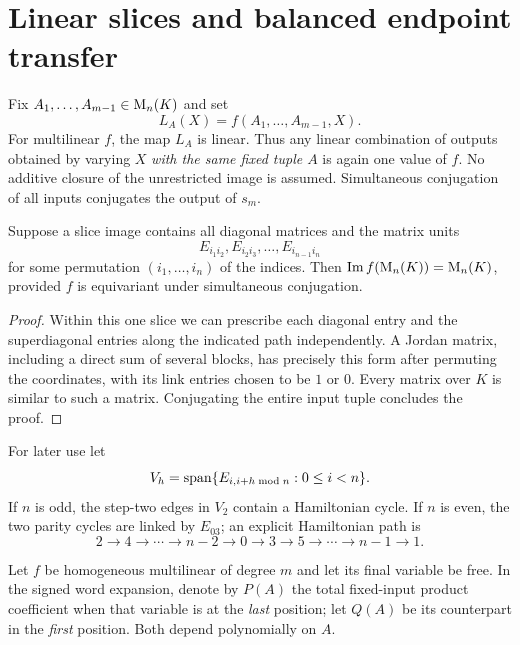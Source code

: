 \section{Linear slices and balanced endpoint transfer}\label{sec:slices}
Fix $A_1,\ldots,A_{m-1}\in\mathrm{M}_n(K)$ and set
\begin{equation}\label{eq:slice}
 L_A(X)=f(A_1,\ldots,A_{m-1},X).
\end{equation}
For multilinear $f$, the map $L_A$ is linear. Thus any linear
combination of outputs obtained by varying $X$ \emph{with the same fixed
tuple $A$} is again one value of $f$. No additive closure of the
unrestricted image is assumed. Simultaneous conjugation of all inputs
conjugates the output of $s_m$.

\begin{lemma}\label{lem:jordanpath}
Suppose a slice image contains all diagonal matrices and the matrix
units
\[E_{i_1i_2},E_{i_2i_3},\ldots,E_{i_{n-1}i_n}\]
for some permutation $(i_1,\ldots,i_n)$ of the indices. Then
$\operatorname{Im} f(\mathrm{M}_n(K))=\mathrm{M}_n(K)$, provided $f$ is equivariant under
simultaneous conjugation.
\end{lemma}
\begin{proof}
Within this one slice we can prescribe each diagonal entry and the
superdiagonal entries along the indicated path independently. A
Jordan matrix, including a direct sum of several blocks, has precisely
this form after permuting the coordinates, with its link entries
chosen to be $1$ or $0$. Every matrix over $K$ is similar to such a
matrix. Conjugating the entire input tuple concludes the proof.
\end{proof}

For later use let
\begin{equation}\label{eq:V2}
 V_h=\operatorname{span}\{E_{i,i+h\bmod n}:0\le i<n\}.
\end{equation}
If $n$ is odd, the step-two edges in $V_2$ contain a Hamiltonian
cycle. If $n$ is even, the two parity cycles are linked by $E_{03}$;
an explicit Hamiltonian path is
\begin{equation}\label{eq:evenpath}
 2\longrightarrow4\longrightarrow\cdots\longrightarrow n-2
 \longrightarrow0\longrightarrow3\longrightarrow5
 \longrightarrow\cdots\longrightarrow n-1\longrightarrow1.
\end{equation}

Let $f$ be homogeneous multilinear of degree $m$ and let its final
variable be free. In the signed word expansion, denote by $P(A)$
the total fixed-input product coefficient when that variable is at
the \emph{last} position; let $Q(A)$ be its counterpart in the
\emph{first} position. Both depend polynomially on $A$.

